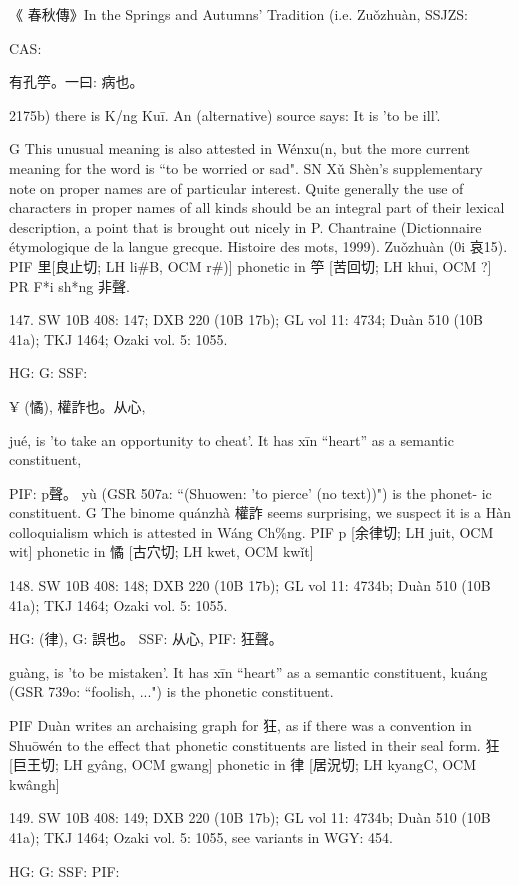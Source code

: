 《 春秋傳》In the Springs and Autumns' Tradition (i.e. Zuǒzhuàn, SSJZS:


CAS:

有孔䇡。一曰:
病也。

2175b) there is K/ng Kuī. An (alternative) source says: It is 'to be ill'.

G     This unusual meaning is also attested in Wénxu(n, but the more current meaning for the word is ``to be worried or sad".
SN Xǔ Shèn's supplementary note on proper names are of particular interest. Quite generally the use of characters in proper names of all kinds should be an integral part of their lexical description, a point that is brought out nicely in P. Chantraine (Dictionnaire étymologique de la langue grecque. Histoire des mots, 1999).
Zuǒzhuàn (0i 哀15).
PIF     里[良止切; LH li\#B, OCM r\#)] phonetic in 䇡 [苦回切; LH khui, OCM ?]
PR	F*i sh*ng 非聲.

147. SW 10B 408: 147; DXB 220 (10B 17b); GL vol 11: 4734; Duàn 510 (10B 41a); TKJ 1464; Ozaki vol. 5: 1055.


HG:
G: SSF:

¥ (憰), 權詐也。从心,


jué,
is 'to take an opportunity to cheat'.
It has xīn ``heart'' as a semantic constituent,



PIF:     p聲。	yù (GSR 507a: ``(Shuowen: 'to pierce' (no text))") is the phonet- ic constituent.
G	The binome quánzhà 權詐 seems surprising, we suspect it is a Hàn colloquialism which is attested in Wáng Ch\%ng.
PIF     p [余律切; LH juit, OCM wit] phonetic in 憰 [古穴切; LH kwet, OCM kwǐt]

148. SW 10B 408: 148; DXB 220 (10B 17b); GL vol 11: 4734b; Duàn 510 (10B 41a); TKJ 1464; Ozaki vol. 5: 1055.


HG:	(律),
G:	誤也。
SSF: 从心,
PIF: 狂聲。

guàng,
is 'to be mistaken'.
It has xīn ``heart'' as a semantic constituent,
kuáng (GSR 739o: ``foolish, ...") is the phonetic constituent.

PIF     Duàn writes an archaising graph for 狂, as if there was a convention in Shuōwén to the effect that phonetic constituents are listed in their seal form.
狂[巨王切; LH gyâng, OCM gwang] phonetic in 律 [居況切; LH kyangC, OCM kwângh]

149. SW 10B 408: 149; DXB 220 (10B 17b); GL vol 11: 4734b; Duàn 510 (10B 41a); TKJ 1464; Ozaki vol. 5: 1055, see
variants in WGY: 454.


HG:
G: SSF: PIF:

